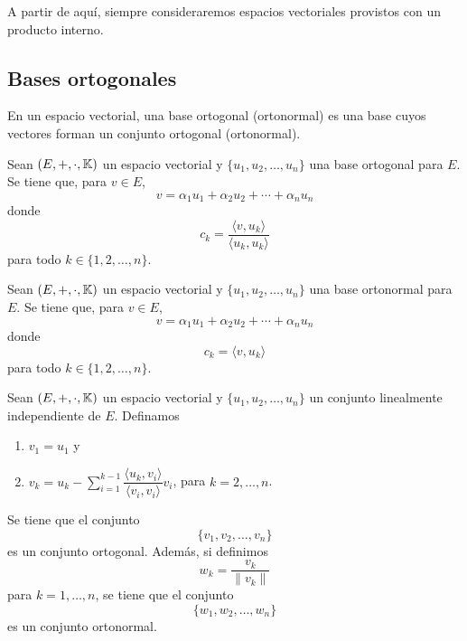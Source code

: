 \documentclass[a4,11pt]{aleph-notas}
\begin{document}

A partir de aquí, siempre consideraremos espacios vectoriales provistos con un producto interno.


\subsection{Bases ortogonales}

\begin{defi}
    En un espacio vectorial, una base ortogonal (ortonormal) es una base cuyos vectores forman un conjunto ortogonal (ortonormal). 
\end{defi}

\begin{teo}
    Sean $(E,+,\cdot,\mathbb{K})$ un espacio vectorial y $\{u_1, u_2, \ldots, u_n\}$ una base ortogonal para $E$. Se tiene que, para $v \in E$,
    \[
        v = \alpha_1 u_1 + \alpha_2 u_2 +\cdots + \alpha_n u_n
    \]
    donde
    \[
        c_k = \dfrac{\langle v, u_k \rangle}{\langle u_k, u_k \rangle}
    \]
    para todo $k \in \{1, 2, \ldots, n\}$.
\end{teo}


\begin{teo}
    Sean $(E,+,\cdot,\mathbb{K})$ un espacio vectorial y $\{u_1, u_2, \ldots, u_n\}$ una base ortonormal para $E$. Se tiene que, para $v \in E$,
    \[
        v = \alpha_1 u_1 + \alpha_2 u_2 +\cdots + \alpha_n u_n
    \]
    donde
    \[
        c_k = \langle v, u_k \rangle 
    \]
    para todo $k \in \{1, 2, \ldots, n\}$.
\end{teo}


\begin{teo}
    Sean $(E,+,\cdot,\mathbb{K})$ un espacio vectorial y $\{u_1, u_2, \ldots, u_n\}$ un conjunto linealmente independiente de $E$. Definamos
    \begin{enumerate}
    \item 
        $v_1 = u_1$ y
    \item
        $\displaystyle v_k = 
            u_k 
            - \sum_{i=1}^{k-1} \dfrac{\langle u_k, v_i\rangle}{\langle v_i,v_i\rangle} v_i$, para $k=2,\ldots,n$.
    \end{enumerate}
    Se tiene que el conjunto
    \[
        \{v_1, v_2, \ldots, v_n\}
    \]
    es un conjunto ortogonal. Además, si definimos
    \[
        w_k = \dfrac{v_k}{\|v_k\|}
    \]
    para $k=1,\ldots,n$, se tiene que el conjunto
    \[
        \{w_1, w_2, \ldots, w_n\}
    \]
    es un conjunto ortonormal.
\end{teo}
\end{document}
